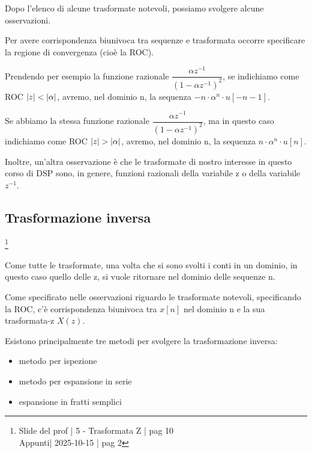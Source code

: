 Dopo l'elenco di alcune trasformate notevoli, possiamo svolgere alcune osservazioni. \newline 

Per avere corrispondenza biunivoca tra sequenze e trasformata occorre specificare la regione di convergenza (cioè la ROC). \newline 

Prendendo per esempio la funzione razionale $\dfrac{\alpha z^{-1}}{\left( 1 - \alpha z^{-1}\right)^{2}}$, 
se indichiamo come ROC $\abs{z} < \abs{\alpha}$, avremo, nel dominio n, la sequenza $-n \cdot \alpha^{n} \cdot  u \left[ -n - 1\right]$. \newline 

Se abbiamo la stessa funzione razionale $\dfrac{\alpha z^{-1}}{\left( 1 - \alpha z^{-1}\right)^{2}}$, 
ma in questo caso indichiamo come ROC $\abs{z} > \abs{\alpha}$, avremo, nel dominio n, la sequenza $n \cdot \alpha^{n} \cdot  u \left[ n\right]$. \newline 

Inoltre, un'altra osservazione è che le trasformate di nostro interesse in questo corso di DSP sono, in genere, 
funzioni razionali della variabile z o della variabile $z^{-1}$. \newline  

\newpage 

\subsection{Trasformazione inversa}

\footnote{ 
    Slide del prof | 5 - Trasformata Z | pag 10 \\
    Appunti| 2025-10-15 | pag 2
}

Come tutte le trasformate, una volta che si sono svolti i conti in un dominio, in questo caso quello delle z, 
si vuole ritornare nel dominio delle sequenze n. \newline 

Come specificato nelle osservazioni riguardo le trasformate notevoli, 
specificando la ROC, c'è corrispondenza biunivoca tra $x \left[ n\right]$ nel dominio n e la sua trasformata-z $X \left( z\right)$. \newline 

Esistono principalmente tre metodi per svolgere la trasformazione inversa: 

\begin{itemize}
    \item metodo per ispezione 
    \item metodo per espansione in serie 
    \item espansione in fratti semplici
\end{itemize} 

